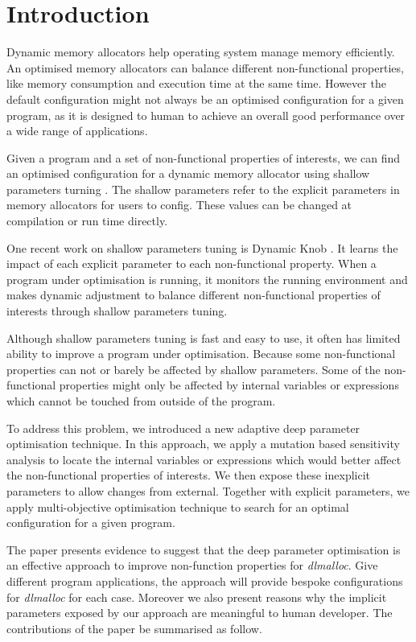 
\section{Introduction}

Dynamic memory allocators help operating system manage memory efficiently. An optimised memory allocators can balance different non-functional properties, like memory consumption and execution time at the same time.
However the default configuration might not always be an optimised configuration for a given program, as it is designed to human to achieve an overall good performance over a wide range of applications.

Given a program and a set of non-functional properties of interests, we can find an optimised configuration for a dynamic memory allocator using shallow parameters turning \cite{hutter2009paramils,Hoffmann:2011:DKR:1961296.1950390}. The shallow parameters refer to the explicit parameters in memory allocators for users to config. These values can be changed at compilation or run time directly. 

One recent work on shallow parameters tuning is Dynamic Knob \cite{Hoffmann:2011:DKR:1961296.1950390}. It learns the impact of each explicit parameter to each non-functional property. When a program under optimisation is running, it monitors the running environment and makes dynamic adjustment to balance different non-functional properties of interests through shallow parameters tuning.

Although shallow parameters tuning is fast and easy to use, it often has limited ability to improve a program under optimisation. Because some non-functional properties can not or barely be affected by shallow parameters. Some of the non-functional properties might only be affected by internal variables or expressions which cannot be touched from outside of the program.

To address this problem, we introduced a new adaptive deep parameter optimisation technique. In this approach, we apply a mutation based sensitivity analysis to locate the internal variables or expressions which would better affect the non-functional properties of interests. We then expose these inexplicit parameters to allow changes from external. Together with explicit parameters, we apply multi-objective optimisation technique to search for an optimal configuration for a given program.


The paper presents evidence to suggest that the deep parameter optimisation is an effective approach to improve non-function properties for \emph{dlmalloc}. Give different program applications, the approach will provide bespoke configurations for \emph{dlmalloc} for each case. Moreover we also present reasons why the implicit parameters exposed by our approach are meaningful to human developer. The contributions of the paper be summarised as follow.

